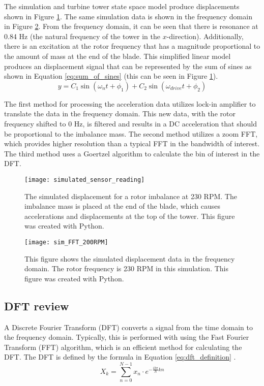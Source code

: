 The simulation and turbine tower state space model produce displacements shown in Figure \ref{fig:simulated_sensor_reading}.  The same simulation data is shown in the frequency domain  in Figure \ref{fig:sim_FFT_200RPM}.  From the frequency domain, it can be seen that there is resonance at 0.84 Hz (the natural frequency of the tower in the $x$-direction).  Additionally, there is an excitation at the rotor frequency that has a magnitude proportional to the amount of mass at the end of the blade.  This simplified linear model produces an displacement signal that can be represented by the sum of sines as shown in Equation \ref{eq:sum_of_sines} (this can be seen in Figure \ref{fig:simulated_sensor_reading}).
\begin{equation} \label{eq:sum_of_sines}
	y = C_1 \sin{(\omega_n t + \phi_1)} + C_2 \sin{(\omega_{drive} t + \phi_2)}
\end{equation}

The first method for processing the acceleration data utilizes lock-in amplifier to translate the data in the frequency domain.  This new data, with the rotor frequency shifted to 0 Hz, is filtered and results in a DC acceleration that should be proportional to the imbalance mass.  The second method utilizes a zoom FFT, which provides higher resolution than a typical FFT in the bandwidth of interest.  The third method uses a Goertzel algorithm to calculate the bin of interest in the DFT.

\begin{figure}
	\centering
	\texttt{[image: simulated\_sensor\_reading]}
	\decoRule
	\caption{The simulated displacement for a rotor imbalance at 230 RPM.  The imbalance mass is placed at the end of the blade, which causes accelerations and displacements at the top of the tower.  This figure was created with Python.}
	\label{fig:simulated_sensor_reading}
\end{figure}

\begin{figure}
	\centering
	\texttt{[image: sim\_FFT\_200RPM]}
	\decoRule
	\caption{This figure shows the simulated displacement data in the frequency domain.  The rotor frequency is 230 RPM in this simulation. This figure was created with Python.}
	\label{fig:sim_FFT_200RPM}
\end{figure}

\subsection{DFT review}
A Discrete Fourier Transform (DFT) converts a signal from the time domain to the frequency domain.  Typically, this is performed with using the Fast Fourier Transform (FFT) algorithm, which is an efficient method for calculating the DFT.  The DFT is defined by the formula in Equation \ref{eq:dft_definition} \cite{winograd1976computing}.
\begin{equation} \label{eq:dft_definition}
	X_k = \sum_{n=0}^{N-1}{x_n \cdot e^{-\frac{i 2 \pi}{N} k n}}
\end{equation}

